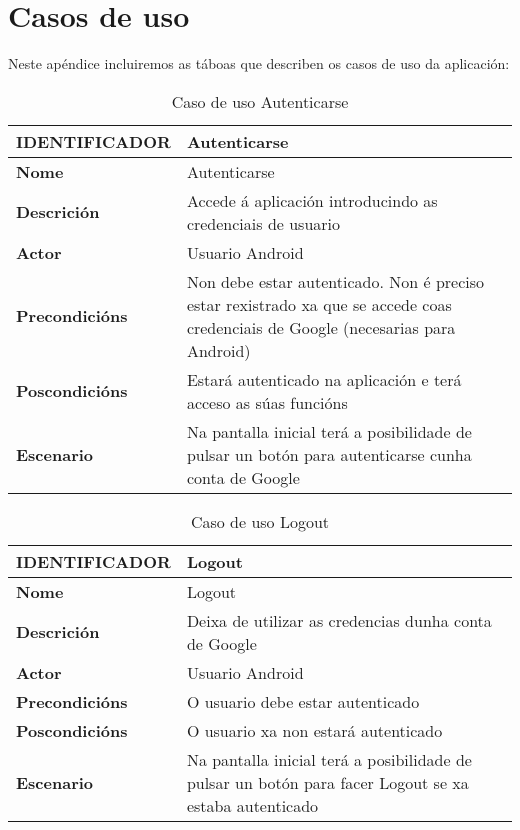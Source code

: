 \chapter{Casos de uso}

Neste apéndice incluiremos as táboas que describen os casos de uso da aplicación:

\begin{table} [tbp]
	\begin{tabular}{|l|p{10cm}|}
		\hline 
		\textbf{IDENTIFICADOR}	& \textbf{Autenticarse} \\ 
		\hline 
		\textbf{Nome} & Autenticarse \\ 
		\hline 
		\textbf{Descrición} & Accede á aplicación introducindo as credenciais de usuario \\ 
		\hline 
		\textbf{Actor} & Usuario Android \\ 
		\hline 
		\textbf{Precondicións} & Non debe estar autenticado. Non é preciso estar rexistrado xa que se accede coas credenciais de Google (necesarias para Android) \\ 
		\hline 
		\textbf{Poscondicións} & Estará autenticado na aplicación e terá acceso as súas funcións \\ 
		\hline 
		\textbf{Escenario} & Na pantalla inicial terá a posibilidade de pulsar un botón para autenticarse cunha conta de Google \\ 
		\hline 
	\end{tabular}
	\caption{Caso de uso Autenticarse}
	\label{tab:cuAutenticar}
\end{table}

\begin{table} [tbp]
	\begin{tabular}{|l|p{10cm}|}
		\hline 
		\textbf{IDENTIFICADOR}	& \textbf{Logout} \\ 
		\hline 
		\textbf{Nome} & Logout \\ 
		\hline 
		\textbf{Descrición} & Deixa de utilizar as credencias dunha conta de Google \\ 
		\hline 
		\textbf{Actor} & Usuario Android \\ 
		\hline 
		\textbf{Precondicións} & O usuario debe estar autenticado \\ 
		\hline 
		\textbf{Poscondicións} & O usuario xa non estará autenticado \\ 
		\hline 
		\textbf{Escenario} & Na pantalla inicial terá a posibilidade de pulsar un botón para facer Logout se xa estaba autenticado \\ 
		\hline 
	\end{tabular}
	\caption{Caso de uso Logout}
	\label{tab:cuLogout}
\end{table}

